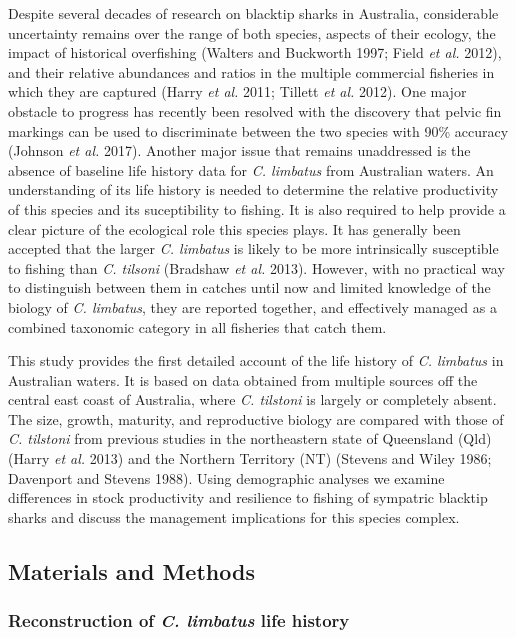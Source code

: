 \documentclass[]{article}
\begin{document}
Despite several decades of research on blacktip sharks in Australia,
considerable uncertainty remains over the range of both species, aspects
of their ecology, the impact of historical overfishing (Walters and
Buckworth 1997; Field \emph{et al.} 2012), and their relative abundances
and ratios in the multiple commercial fisheries in which they are
captured (Harry \emph{et al.} 2011; Tillett \emph{et al.} 2012). One
major obstacle to progress has recently been resolved with the discovery
that pelvic fin markings can be used to discriminate between the two
species with 90\% accuracy (Johnson \emph{et al.} 2017). Another major
issue that remains unaddressed is the absence of baseline life history
data for \emph{C. limbatus} from Australian waters. An understanding of
its life history is needed to determine the relative productivity of
this species and its suceptibility to fishing. It is also required to
help provide a clear picture of the ecological role this species plays.
It has generally been accepted that the larger \emph{C. limbatus} is
likely to be more intrinsically susceptible to fishing than \emph{C.
tilsoni} (Bradshaw \emph{et al.} 2013). However, with no practical way
to distinguish between them in catches until now and limited knowledge
of the biology of \emph{C. limbatus}, they are reported together, and
effectively managed as a combined taxonomic category in all fisheries
that catch them.

This study provides the first detailed account of the life history of
\emph{C. limbatus} in Australian waters. It is based on data obtained
from multiple sources off the central east coast of Australia, where
\emph{C. tilstoni} is largely or completely absent. The size, growth,
maturity, and reproductive biology are compared with those of \emph{C.
tilstoni} from previous studies in the northeastern state of Queensland
(Qld) (Harry \emph{et al.} 2013) and the Northern Territory (NT)
(Stevens and Wiley 1986; Davenport and Stevens 1988). Using demographic
analyses we examine differences in stock productivity and resilience to
fishing of sympatric blacktip sharks and discuss the management
implications for this species complex.

\hypertarget{materials-and-methods}{%
\subsection{Materials and Methods}\label{materials-and-methods}}

\hypertarget{reconstruction-of-c.-limbatus-life-history}{%
\subsubsection{\texorpdfstring{Reconstruction of \emph{C. limbatus} life
history}{Reconstruction of C. limbatus life history}}\label{reconstruction-of-c.-limbatus-life-history}}
\end{document}
